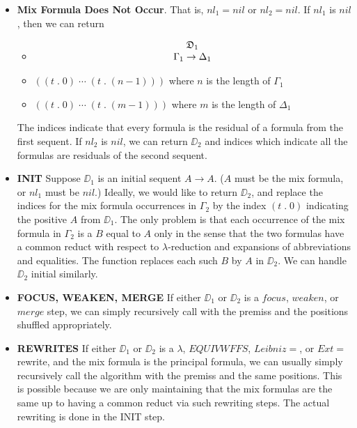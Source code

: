 \begin{itemize}
\item {\bf Mix Formula Does Not Occur}.  That is, $nl_1 = nil$ or $nl_2 = nil$.
If $nl_1$ is $nil$, then we can return
\begin{itemize}
\item $$\begin{array}[b]{c}\relax {\mathfrak D}_1\\ \relax \Gamma_1\rightarrow\Delta_1\end{array}$$
\item $((t\; .\; 0)\; \cdots \; (t\; . \; (n - 1)))$ where $n$ is the length of $\Gamma_1$
\item $((t\; .\; 0)\; \cdots \; (t\; . \; (m - 1)))$ where $m$ is the length of $\Delta_1$
\end{itemize}
The indices indicate that every formula is the residual of a formula from
the first sequent.
If $nl_2$ is $nil$, we can return $\DD_2$ and indices which indicate
all the formulas are residuals of the second sequent.
\item {\bf INIT}  Suppose $\DD_1$ is an initial sequent $A\rightarrow A$.
($A$ must be the mix formula, or $nl_1$ must be $nil$.)
Ideally, we would like to return $\DD_2$, and replace the indices
for the mix formula occurrences in $\Gamma_2$ by the index $(t\; .\; 0)$
indicating the positive $A$ from $\DD_1$.
The only problem is that each occurrence of the mix formula in
$\Gamma_2$ is a $B$ equal to $A$ only in the sense that the
two formulas have a common reduct with respect to
$\lambda$-reduction
and expansions of abbreviations and equalities.
The function  replaces
each such $B$ by $A$ in $\DD_2$.
We can handle $\DD_2$ initial similarly.
\item {\bf FOCUS, WEAKEN, MERGE}  If either $\DD_1$ or $\DD_2$ is
a $focus$, $weaken$, or $merge$ step, we can simply recursively
call with the premiss and the positions shuffled appropriately.
\item {\bf REWRITES}  If either $\DD_1$ or $\DD_2$
is a $\lambda$, $EQUIVWFFS$, $Leibniz=$, or $Ext=$ rewrite,
and the mix formula is the principal formula, we can usually simply
recursively call the algorithm with the premiss and the same positions.
This is possible because we are only maintaining that the mix formulas
are the same up to having a common reduct via such rewriting steps.
The actual rewriting is done in the INIT step.


\end{itemize}
